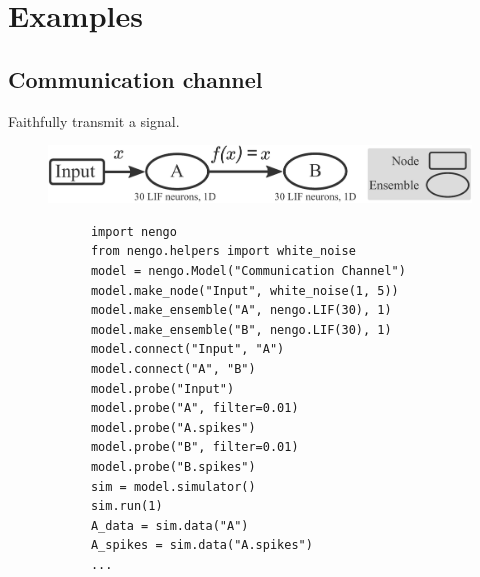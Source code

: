 \documentclass{frontiersSCNS}
\begin{document}
\section{Examples}

\subsection{Communication channel}

Faithfully transmit a signal.

\begin{figure}
\begin{center}
  \includegraphics[width=.9\textwidth]{comm_channel}
  \begin{minipage}{0.58\textwidth}
    \begin{lstlisting}
      import nengo
      from nengo.helpers import white_noise
      model = nengo.Model("Communication Channel")
      model.make_node("Input", white_noise(1, 5))
      model.make_ensemble("A", nengo.LIF(30), 1)
      model.make_ensemble("B", nengo.LIF(30), 1)
      model.connect("Input", "A")
      model.connect("A", "B")
      model.probe("Input")
      model.probe("A", filter=0.01)
      model.probe("A.spikes")
      model.probe("B", filter=0.01)
      model.probe("B.spikes")
      sim = model.simulator()
      sim.run(1)
      A_data = sim.data("A")
      A_spikes = sim.data("A.spikes")
      ...
    \end{lstlisting}
  \end{minipage}
  \begin{minipage}{0.37\textwidth}

\end{minipage}
\end{center}
\end{figure}
\end{document}
